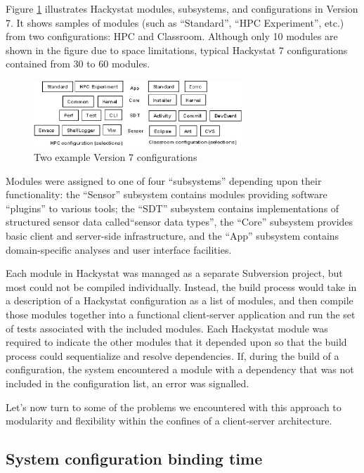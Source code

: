 \documentclass[conference,compsoc,peerreview]{IEEEtran}
\begin{document}
Figure \ref{fig:configurations} illustrates Hackystat modules, subsystems,
and configurations in Version 7.  It shows samples of modules (such as
``Standard'', ``HPC Experiment'', etc.) from two configurations: HPC and
Classroom.  Although only 10 modules are shown in the figure due to space
limitations, typical Hackystat 7 configurations contained from 30 to 60
modules.

\begin{figure}[ht]
  \center
  \includegraphics[width=0.7\textwidth]{configurations5.eps}
  \caption{Two example Version 7 configurations}
  \label{fig:configurations}
\end{figure} 


Modules were assigned to one of four ``subsystems'' depending upon their
functionality: the ``Sensor'' subsystem contains modules providing software
``plugins'' to various tools; the ``SDT'' subsystem contains
implementations of structured sensor data called``sensor data types'', the
``Core'' subsystem provides basic client and server-side infrastructure,
and the ``App'' subsystem contains domain-specific analyses and user
interface facilities.


Each module in Hackystat was managed as a separate Subversion project, but
most could not be compiled individually. Instead, the build process would
take in a description of a Hackystat configuration as a list of modules,
and then compile those modules together into a functional client-server
application and run the set of tests associated with the included modules.
Each Hackystat module was required to indicate the other modules that it
depended upon so that the build process could sequentialize and resolve
dependencies.  If, during the build of a configuration, the system
encountered a module with a dependency that was not included in the
configuration list, an error was signalled.

Let's now turn to some of the problems we encountered with this approach to
modularity and flexibility within the confines of a client-server
architecture.

\subsection{System configuration binding time}
\end{document}
